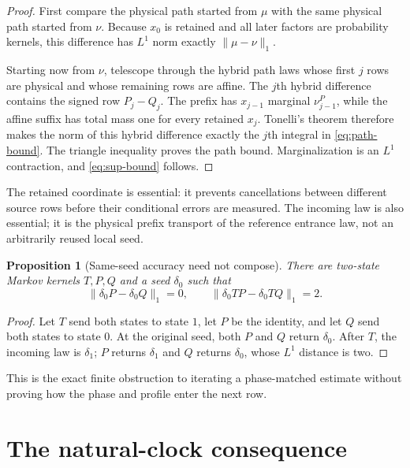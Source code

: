 \documentclass[11pt]{article}
\newtheorem{proposition}[theorem]{Proposition}
\theoremstyle{remark}
\begin{document}
\begin{proof}
First compare the physical path started from $\mu$ with the same physical
path started from $\nu$.  Because $x_0$ is retained and all later factors are
probability kernels, this difference has $L^1$ norm exactly
$\|\mu-\nu\|_1$.

Starting now from $\nu$, telescope through the hybrid path laws whose first
$j$ rows are physical and whose remaining rows are affine.  The $j$th hybrid
difference contains the signed row $P_j-Q_j$.  The prefix has
$x_{j-1}$ marginal $\nu^P_{j-1}$, while the affine suffix has total mass one
for every retained $x_j$.  Tonelli's theorem therefore makes the norm of this
hybrid difference exactly the $j$th integral in \eqref{eq:path-bound}.
The triangle inequality proves the path bound.  Marginalization is an
$L^1$ contraction, and \eqref{eq:sup-bound} follows.
\end{proof}

The retained coordinate is essential: it prevents cancellations between
different source rows before their conditional errors are measured.  The
incoming law is also essential; it is the physical prefix transport of the
reference entrance law, not an arbitrarily reused local seed.

\begin{proposition}[Same-seed accuracy need not compose]
\label{prop:phase-counterexample}
There are two-state Markov kernels $T,P,Q$ and a seed $\delta_0$ such that
\begin{equation}
 \|\delta_0P-\delta_0Q\|_1=0,
 \qquad
 \|\delta_0TP-\delta_0TQ\|_1=2.
 \label{eq:phase-counterexample}
\end{equation}
\end{proposition}

\begin{proof}
Let $T$ send both states to state $1$, let $P$ be the identity, and let $Q$
send both states to state $0$.  At the original seed, both $P$ and $Q$ return
$\delta_0$.  After $T$, the incoming law is $\delta_1$; $P$ returns
$\delta_1$ and $Q$ returns $\delta_0$, whose $L^1$ distance is two.
\end{proof}

This is the exact finite obstruction to iterating a phase-matched estimate
without proving how the phase and profile enter the next row.

\section{The natural-clock consequence}
\end{document}
